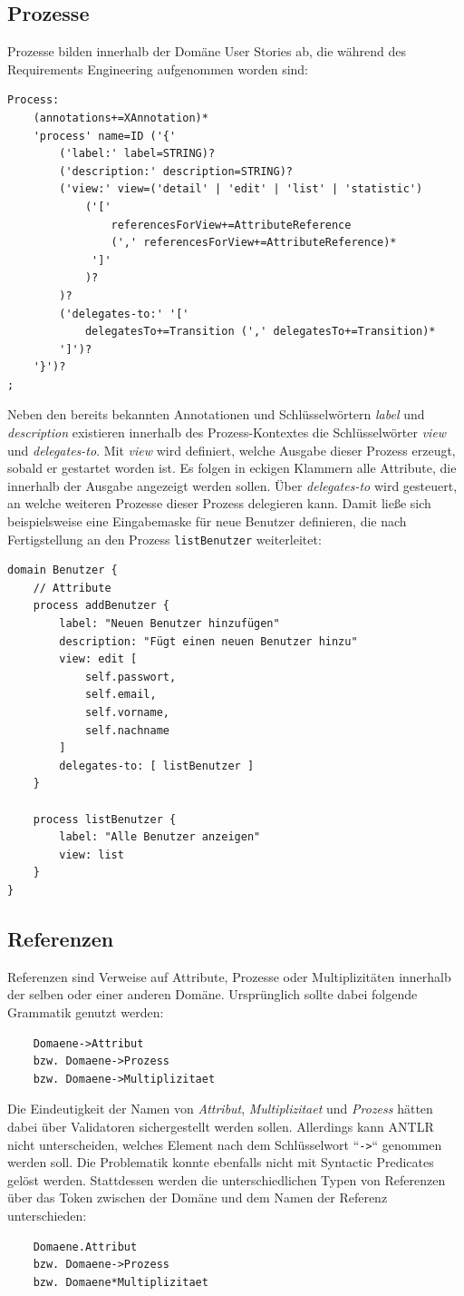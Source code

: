 \documentclass[a4paper,12pt]{scrreprt}
\begin{document}
\subsection{Prozesse}
Prozesse bilden innerhalb der Domäne User Stories ab, die während des Requirements Engineering aufgenommen worden sind:
\begin{verbatim}
Process:
    (annotations+=XAnnotation)*
    'process' name=ID ('{'
        ('label:' label=STRING)?
        ('description:' description=STRING)? 
        ('view:' view=('detail' | 'edit' | 'list' | 'statistic')
            ('[' 
                referencesForView+=AttributeReference 
                (',' referencesForView+=AttributeReference)*
             ']'
            )?
        )?
        ('delegates-to:' '[' 
            delegatesTo+=Transition (',' delegatesTo+=Transition)* 
        ']')?
    '}')?
;
\end{verbatim}
Neben den bereits bekannten Annotationen und Schlüsselwörtern \textit{label} und \textit{description} existieren innerhalb des Prozess-Kontextes die Schlüsselwörter \textit{view} und \textit{delegates-to}. Mit \textit{view} wird definiert, welche Ausgabe dieser Prozess erzeugt, sobald er gestartet worden ist. Es folgen in eckigen Klammern alle Attribute, die innerhalb der Ausgabe angezeigt werden sollen. Über \textit{delegates-to} wird gesteuert, an welche weiteren Prozesse dieser Prozess delegieren kann.
Damit ließe sich beispielsweise eine Eingabemaske für neue Benutzer definieren, die nach Fertigstellung an den Prozess \verb+listBenutzer+ weiterleitet:
\begin{verbatim}
domain Benutzer {
    // Attribute
    process addBenutzer {
        label: "Neuen Benutzer hinzufügen"
        description: "Fügt einen neuen Benutzer hinzu"
        view: edit [
            self.passwort,
            self.email,
            self.vorname, 
            self.nachname
        ]
        delegates-to: [ listBenutzer ]
    }

    process listBenutzer {
        label: "Alle Benutzer anzeigen"
        view: list
    }
}
\end{verbatim}
\subsection{Referenzen}
Referenzen sind Verweise auf Attribute, Prozesse oder Multiplizitäten innerhalb der selben oder einer anderen Domäne. Ursprünglich sollte dabei folgende Grammatik genutzt werden:
\begin{verbatim}
	Domaene->Attribut
	bzw. Domaene->Prozess
	bzw. Domaene->Multiplizitaet
\end{verbatim}
Die Eindeutigkeit der Namen von \textit{Attribut}, \textit{Multiplizitaet} und \textit{Prozess} hätten dabei über Validatoren sichergestellt werden sollen. Aller\-dings kann ANTLR nicht unterscheiden, welches Element nach dem Schlüsselwort ``\verb+->+`` genommen werden soll. Die Problematik konnte ebenfalls nicht mit Syntactic Predicates gelöst werden. Stattdessen werden die unterschiedlichen Typen von Referenzen über das Token zwischen der Domäne und dem Namen der Referenz unterschieden:
\begin{verbatim}
	Domaene.Attribut
	bzw. Domaene->Prozess
	bzw. Domaene*Multiplizitaet
\end{verbatim}
\end{document}
